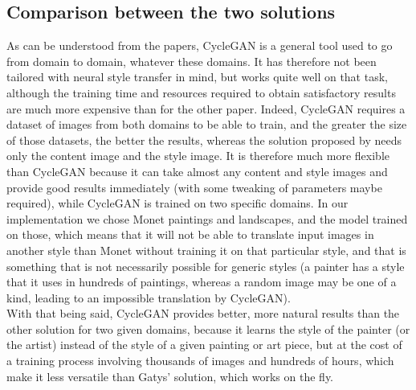 \documentclass[twocolumn,superscriptaddress,aps,floatfix,nofootinbib]{revtex4-1}
\begin{document}
    \subsection{Comparison between the two solutions}
    
    As can be understood from the papers, CycleGAN is a general tool used to go from domain to domain, whatever these domains. It has therefore not been tailored with neural style transfer in mind, but works quite well on that task, although the training time and resources required to obtain satisfactory results are much more expensive than for the other paper. Indeed, CycleGAN requires a dataset of images from both domains to be able to train, and the greater the size of those datasets, the better the results, whereas the solution proposed by \cite{DBLP:journals/corr/GatysEB15a} needs only the content image and the style image. It is therefore much more flexible than CycleGAN because it can take almost any content and style images and provide good results immediately (with some tweaking of parameters maybe required), while CycleGAN is trained on two specific domains. In our implementation we chose Monet paintings and landscapes, and the model trained on those, which means that it will not be able to translate input images in another style than Monet without training it on that particular style, and that is something that is not necessarily possible for generic styles (a painter has a style that it uses in hundreds of paintings, whereas a random image may be one of a kind, leading to an impossible translation by CycleGAN).\\
    
    With that being said, CycleGAN provides better, more natural results than the other solution for two given domains, because it learns the style of the painter (or the artist) instead of the style of a given painting or art piece, but at the cost of a training process involving thousands of images and hundreds of hours, which make it less versatile than Gatys' solution, which works on the fly.
    
    
    
    
    \appendix
    
    
    
\end{document}
